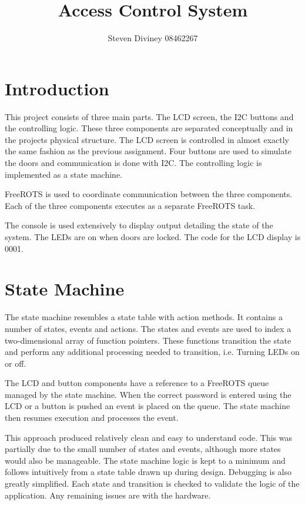 \documentclass{article}
\title{Access Control System}
\author{Steven Diviney 08462267}
\begin{document}
\maketitle

\newpage

 

\section{Introduction}
This project consists of three main parts. The LCD screen, the I2C buttons and the controlling logic. These three components are separated conceptually and in the projects physical structure. The LCD screen is controlled in almost exactly the same fashion as the previous assignment. Four buttons are used to simulate the doors and communication is done with I2C. The controlling logic is implemented as a state machine. 

FreeROTS is used to coordinate communication between the three components. Each of the three components executes as a separate FreeROTS task.

The console is used extensively to display output detailing the state of the system. The LEDs are on when doors are locked. The code for the LCD display is 0001.

\section{State Machine}
The state machine resembles a state table with action methods. It contains a number of states, events and actions. The states and events are used to index a two-dimensional array of function pointers. These functions transition the state and perform any additional processing needed to transition, i.e. Turning LEDs on or off. 

The LCD and button components have a reference to a FreeROTS queue managed by the state machine. When the correct password is entered using the LCD or a button is pushed an event is placed on the queue. The state machine then resumes execution and processes the event.


This approach produced relatively clean and easy to understand code. This was partially due to the small number of states and events, although more states would also be manageable. The state machine logic is kept to a minimum and follows intuitively from a state table drawn up during design. Debugging is also greatly simplified. Each state and transition is checked to validate the logic of the application. Any remaining issues are with the hardware.
\end{document}
